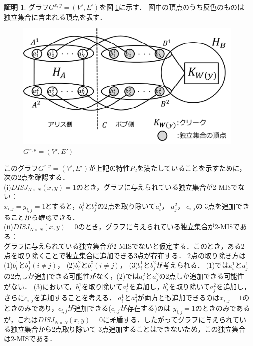 \documentclass[12pt]{thesis}
\theoremstyle{definition}
\newtheorem*{prf*}{証明}
\begin{document}
\begin{prf*}
グラフ$G^{x, y} = (V', E')$を図 \ref{2_G(x,y)}に示す．
図中の頂点のうち灰色のものは独立集合に含まれる頂点を表す．

\begin{figure}[ht]
\begin{center}
\includegraphics[width=120mm]{2_Gxy.png}
\end{center}
\caption{$G^{x, y} = (V', E')$}
\label{2_G(x,y)}
\end{figure}

このグラフ$G^{x, y} = (V', E')$が上記の特性$P_{2}$を満たしていることを示すために，次の2点を確認する． \\
(i)$DISJ_{N \times N} (x, y) = 1$のとき，グラフに与えられている独立集合が2-MISでない： \\
$x_{i, j} = y_{i, j} =1$とすると，$b_{i}^{1}$と$b_{j}^{2}$の2点を取り除いて$a_{i}^{1}$， $a_{j}^{2}$， $c_{i, j}$の
3点を追加できることから確認できる． \\
(ii)$DISJ_{N \times N} (x, y) = 0$のとき，グラフに与えられている独立集合が2-MISである： \\ 
グラフに与えられている独立集合が2-MISでないと仮定する．このとき，ある2点を取り除くことで独立集合に追加できる3点が存在する．
2点の取り除き方は(1)$b_{i}^{1}$と$b_{j}^{1}(i \neq j)$， (2)$b_{i}^{2}$と$b_{j}^{2}(i \neq j)$， (3)$b_{i}^{1}$と$b_{j}^{2}$が考えられる．
(1)では$a_{i}^{1}$と$a_{j}^{1}$の2点しか追加できる可能性がなく，(2)では$a_{i}^{2}$と$a_{j}^{2}$の2点しか追加できる可能性がない．
(3)において，$b_{i}^{1}$を取り除いて$a_{i}^{1}$を追加し，$b_{j}^{2}$を取り除いて$a_{j}^{2}$を追加し，さらに$c_{i, j}$を追加することを考える．
$a_{i}^{1}$と$a_{j}^{2}$が両方とも追加できるのは$x_{i, j} = 1$のときのみであり，$c_{i, j}$が追加できる($c_{i, j}$が存在する)のは
$y_{i, j} = 1$のときのみであるが，これは$DISJ_{N \times N} (x, y) = 0$に矛盾する．したがってグラフに与えられている独立集合から2点取り除いて
3点追加することはできないため，この独立集合は2-MISである．


\end{prf*}
\end{document}
